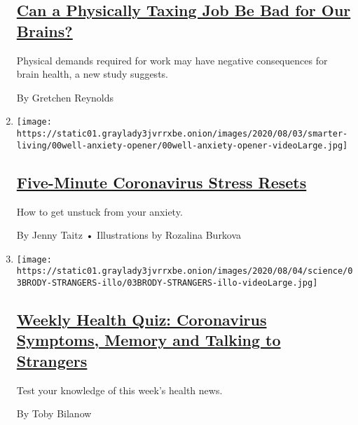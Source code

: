 \begin{enumerate}
  \hypertarget{can-a-physically-taxing-job-be-bad-for-our-brains}{%
  \subsection{\texorpdfstring{\href{/2020/08/05/well/move/can-a-physically-taxing-job-be-bad-for-our-brains.html}{Can
  a Physically Taxing Job Be Bad for Our
  Brains?}}{Can a Physically Taxing Job Be Bad for Our Brains?}}\label{can-a-physically-taxing-job-be-bad-for-our-brains}}

  Physical demands required for work may have negative consequences for
  brain health, a new study suggests.

  By Gretchen Reynolds
\item
  \texttt{[image: https://static01.graylady3jvrrxbe.onion/images/2020/08/03/smarter-living/00well-anxiety-opener/00well-anxiety-opener-videoLarge.jpg]}

  \hypertarget{five-minute-coronavirus-stress-resets}{%
  \subsection{\texorpdfstring{\href{/2020/08/06/well/mind/five-minute-coronavirus-stress-resets.html}{Five-Minute
  Coronavirus Stress
  Resets}}{Five-Minute Coronavirus Stress Resets}}\label{five-minute-coronavirus-stress-resets}}

  How to get unstuck from your anxiety.

  By Jenny Taitz • Illustrations by Rozalina Burkova
\item
  \texttt{[image: https://static01.graylady3jvrrxbe.onion/images/2020/08/04/science/03BRODY-STRANGERS-illo/03BRODY-STRANGERS-illo-videoLarge.jpg]}

  \hypertarget{weekly-health-quiz-coronavirus-symptoms-memory-and-talking-to-strangers}{%
  \subsection{\texorpdfstring{\href{/interactive/2020/08/07/well/live/07healthquiz-08072020.html}{Weekly
  Health Quiz: Coronavirus Symptoms, Memory and Talking to
  Strangers}}{Weekly Health Quiz: Coronavirus Symptoms, Memory and Talking to Strangers}}\label{weekly-health-quiz-coronavirus-symptoms-memory-and-talking-to-strangers}}

  Test your knowledge of this week's health news.

  By Toby Bilanow
\end{enumerate}


